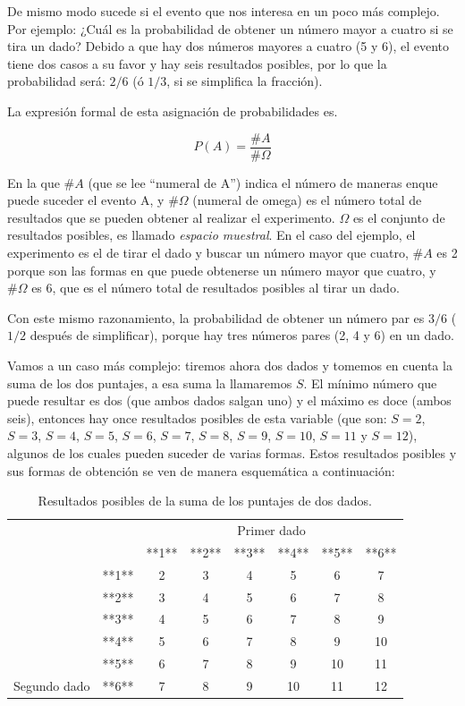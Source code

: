 \documentclass[]{book}
\begin{document}
De mismo modo sucede si el evento que nos interesa en un poco más
complejo. Por ejemplo: ¿Cuál es la probabilidad de obtener un número
mayor a cuatro si se tira un dado? Debido a que hay dos números mayores
a cuatro (5 y 6), el evento tiene dos casos a su favor y hay seis
resultados posibles, por lo que la probabilidad será: \(2/6\) (ó \(1/3\), si se
simplifica la fracción).

La expresión formal de esta asignación de probabilidades es.

\[P(A)=\frac{\#A}{\#\Omega}\]

En la que \(\#A\) (que se lee ``numeral de A'') indica el número de maneras enque puede suceder el evento A, y \(\#\Omega\) (numeral de omega) es el número
total de resultados que se pueden obtener al realizar el experimento. \(\Omega\)
es el conjunto de resultados posibles, es llamado \emph{espacio muestral}. En
el caso del ejemplo, el experimento es el de tirar el dado y buscar un
número mayor que cuatro, \(\#A\) es 2 porque son las formas en que puede
obtenerse un número mayor que cuatro, y \(\#\Omega\) es 6, que es el número total
de resultados posibles al tirar un dado.

Con este mismo razonamiento, la probabilidad de obtener un número par es
\(3/6\) (\(1/2\) después de simplificar), porque hay tres números pares (2, 4 y
6) en un dado.

Vamos a un caso más complejo: tiremos ahora dos dados y tomemos en
cuenta la suma de los dos puntajes, a esa suma la llamaremos \(S\). El
mínimo número que puede resultar es dos (que ambos dados salgan uno) y
el máximo es doce (ambos seis), entonces hay once resultados posibles de
esta variable (que son: \(S = 2\), \(S = 3\), \(S = 4\), \(S = 5\), \(S = 6\), \(S = 7\), \(S = 8\),
\(S = 9\), \(S = 10\), \(S = 11\) y \(S = 12\)), algunos de los cuales pueden suceder de
varias formas. Estos resultados posibles y sus formas de obtención se
ven de manera esquemática a continuación:

\begin{table}

\caption{\label{tab:unnamed-chunk-236}Resultados posibles de la suma de los puntajes de dos dados.}
\centering
\begin{tabular}[t]{lccccccc}
\toprule
\multicolumn{2}{c}{ } & \multicolumn{6}{c}{Primer dado} \\
\cmidrule(l{3pt}r{3pt}){3-8}
 &  & **1** & **2** & **3** & **4** & **5** & **6**\\
\midrule
\rowcolor{gray!6}   & **1** & 2 & 3 & 4 & 5 & 6 & 7\\
\cmidrule{2-8}
 & **2** & 3 & 4 & 5 & 6 & 7 & 8\\
\cmidrule{2-8}
\rowcolor{gray!6}   & **3** & 4 & 5 & 6 & 7 & 8 & 9\\
\cmidrule{2-8}
 & **4** & 5 & 6 & 7 & 8 & 9 & 10\\
\cmidrule{2-8}
\rowcolor{gray!6}   & **5** & 6 & 7 & 8 & 9 & 10 & 11\\
\cmidrule{2-8}
\multirow[t]{-6}{*}{\raggedright\arraybackslash Segundo dado} & **6** & 7 & 8 & 9 & 10 & 11 & 12\\
\bottomrule
\end{tabular}
\end{table}
\end{document}
